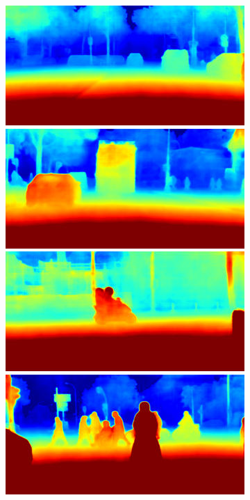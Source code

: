 {\begin{figure}[t]
{{\begin{subfigure}[t]{0.24\linewidth}
\begin{center}
		\includegraphics[width=\linewidth,trim={0px 60px 0 0px},clip]{failure/berlin_000001_000019_depth_prediction.png}
		\includegraphics[width=\linewidth,trim={0px 60px 0 0px},clip]{failure/berlin_000040_000019_depth_prediction.png}
		\includegraphics[width=\linewidth,trim={0px 60px 0 0px},clip]{failure/mainz_000001_031026_depth_prediction.png}
		\includegraphics[width=\linewidth,trim={0px 60px 0 0px},clip]{failure/mainz_000003_014457_depth_prediction.png}

\end{center}
\end{subfigure}}}
\end{figure}}

